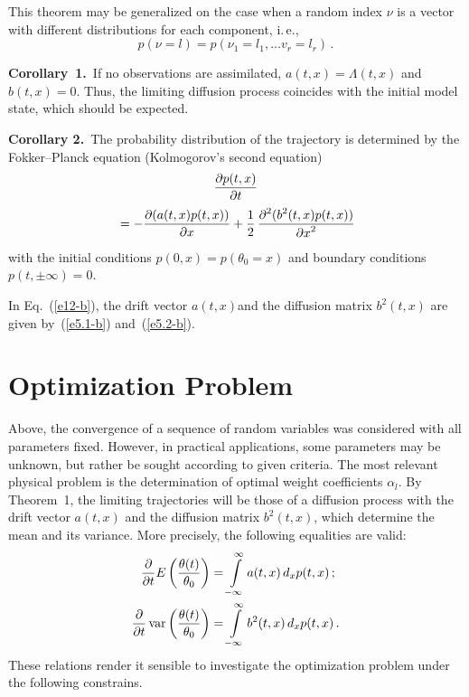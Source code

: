 \begin{multicols}{2}
This theorem may be generalized on the case when a random index $\nu$ is a vector with 
different distributions for each component, i.\,e.,
$$
p(\nu =l)=p(\nu_{1} =l_{1} ,\ldots v_{r} =l_{r} )\,.
$$

\noindent 
\textbf{Corollary~1.}\ 
If no observations are assimilated, ${a(t,x)= \Lambda(t,x)} $ and $b(t,x)=0.$ 
Thus, the limiting diffusion process coincides with the initial model state, 
which should be expected.

\smallskip

\noindent 
\textbf{Corollary 2.}\ 
The probability distribution of the trajectory is determined by the Fokker--Planck 
equation (Kolmogorov's second equation)
\begin{multline}
\displaystyle\frac{\displaystyle \partial p(t,x)\mathstrut}{\displaystyle \partial t\mathstrut}\\
{} =-\displaystyle\frac{\displaystyle \partial (a(t,x)p(t,x))\mathstrut}{\displaystyle \partial x\mathstrut} +
\displaystyle\frac{\displaystyle 1\mathstrut}{\displaystyle 2\mathstrut}\,\displaystyle\frac{\displaystyle \partial ^{2} (b^{2} (t,x)p(t,x))\mathstrut}{\displaystyle \partial x^{2} \mathstrut}
\label{e12-b}
\end{multline}
with the initial conditions $p(0,x)=p(\theta_{0} =x)$ and boundary conditions 
$p(t,\pm \infty )=0$.

In Eq.~(\ref{e12-b}), the drift vector $a(t,x)$and the diffusion matrix $b^{2} (t,x)$ are given 
by~(\ref{e5.1-b}) and~(\ref{e5.2-b}).


\section{Optimization Problem}

\noindent
Above, the convergence of a sequence of random variables was considered with all 
parameters fixed. However, in practical applications, some parameters may  be 
unknown, but rather be sought according to given criteria. The most relevant physical 
problem is the determination of optimal weight coefficients $\alpha_{l} $. By Theorem~1, 
the limiting trajectories will be those of a diffusion process with the drift vector 
$a(t,x)$ and the diffusion matrix $b^{2} (t,x)$, which determine the mean and its variance. 
More precisely, the following equalities are valid:
\begin{align*}
\displaystyle\frac{\displaystyle \partial \mathstrut}{\displaystyle \partial t\mathstrut} E\left(\displaystyle\frac{\displaystyle \theta (t)\mathstrut}{\displaystyle \theta_{0}\mathstrut} \right)&=
\int\limits_{-\infty }^{\infty }a(t,x)\,d_{x} p(t,x)\,;
\\
\displaystyle\frac{\displaystyle \partial \mathstrut}{\displaystyle \partial t\mathstrut} \,\mathrm{var}\left(\displaystyle\frac{\displaystyle \theta (t)\mathstrut}{\displaystyle \theta_{0} \mathstrut}\right)&=
\int\limits_{-\infty }^{\infty }b^{2} (t,x)\,d_{x} p(t,x)\,.
\end{align*}
These relations render it sensible to investigate the optimization problem under the 
following constrains.


\end{multicols}
